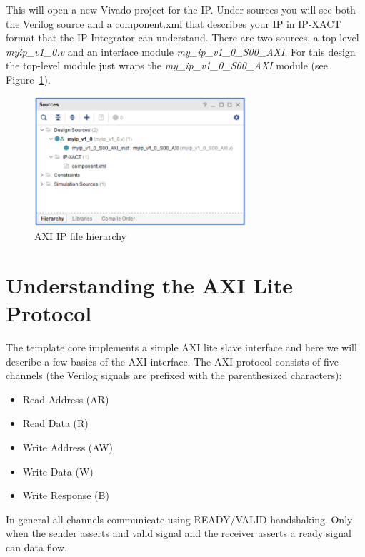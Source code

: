 \documentclass[11pt]{article}
\begin{document}
This will open a new Vivado project for the IP. Under sources you will see both the Verilog source and a component.xml that describes your IP in IP-XACT format that the IP Integrator can understand. There are two sources, a top level \textit{myip\_v1\_0.v} and an interface module \textit{my\_ip\_v1\_0\_S00\_AXI}. For this design the top-level module just wraps the \textit{my\_ip\_v1\_0\_S00\_AXI} module (see Figure~\ref{fig:ip_hier}).

\begin{figure}[!h]
    \centering
    \includegraphics[width=0.7\textwidth]{images/ip_hier.png}
    \caption{AXI IP file hierarchy}
    \label{fig:ip_hier}
\end{figure}




\section{Understanding the AXI Lite Protocol}
\label{sec:understand_axi}
The template core implements a simple AXI lite slave interface and here we will describe a few basics of the AXI interface. The AXI protocol consists of five channels (the Verilog signals are prefixed with the parenthesized characters): 

\begin{itemize}
    \item Read Address (AR)
    \item Read Data (R)
    \item Write Address (AW)
    \item Write Data (W)
    \item Write Response (B)
\end{itemize}

\noindent
In general all channels communicate using READY/VALID handshaking. Only when the
sender asserts and valid signal and the receiver asserts a ready signal can data flow.
\end{document}

